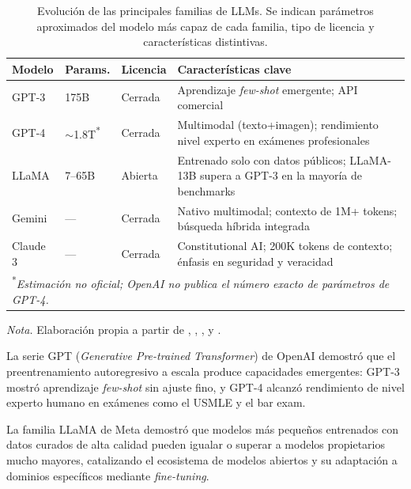 \begin{table}[H]
\centering
\caption{Evolución de las principales familias de \acs{LLM}s. Se indican parámetros aproximados del modelo más capaz de cada familia, tipo de licencia y características distintivas.}
\label{tab:llm-evolution}
\footnotesize
\begin{tabularx}{\columnwidth}{lllX}
\toprule
\textbf{Modelo} & \textbf{Params.} & \textbf{Licencia} & \textbf{Características clave} \\
\midrule
\acs{GPT}-3 & 175B & Cerrada & Aprendizaje \textit{few-shot} emergente; \ac{API} comercial \parencite{brown2020language} \\
\addlinespace
\acs{GPT}-4 & $\sim$1.8T\textsuperscript{*} & Cerrada & Multimodal (texto+imagen); rendimiento nivel experto en exámenes profesionales \parencite{openai2023} \\
\addlinespace
LLaMA & 7--65B & Abierta & Entrenado solo con datos públicos; LLaMA-13B supera a \acs{GPT}-3 en la mayoría de benchmarks \parencite{touvron2023llama} \\
\addlinespace
Gemini & --- & Cerrada & Nativo multimodal; contexto de 1M+ tokens; búsqueda híbrida integrada \parencite{geminiteam2023gemini} \\
\addlinespace
Claude 3 & --- & Cerrada & Constitutional AI; 200K tokens de contexto; énfasis en seguridad y veracidad \parencite{anthropic2024claude3} \\
\bottomrule
\multicolumn{4}{l}{\textsuperscript{*}\textit{Estimación no oficial; OpenAI no publica el número exacto de parámetros de \acs{GPT}-4.}}
\end{tabularx}
\vspace{0.5em}
{\footnotesize\raggedright\textit{Nota.} Elaboración propia a partir de \textcite{brown2020language}, \textcite{openai2023}, \textcite{touvron2023llama}, \textcite{geminiteam2023gemini} y \textcite{anthropic2024claude3}.\par}
\end{table}

La serie \ac{GPT} (\textit{Generative Pre-trained Transformer}) de OpenAI demostró que el preentrenamiento autoregresivo a escala produce capacidades emergentes: \acs{GPT}-3 \parencite{brown2020language} mostró aprendizaje \textit{few-shot} sin ajuste fino, y \acs{GPT}-4 \parencite{openai2023} alcanzó rendimiento de nivel experto humano en exámenes como el \ac{USMLE} y el bar exam.

La familia LLaMA de Meta \parencite{touvron2023llama} demostró que modelos más pequeños entrenados con datos curados de alta calidad pueden igualar o superar a modelos propietarios mucho mayores, catalizando el ecosistema de modelos abiertos y su adaptación a dominios específicos mediante \textit{fine-tuning}.


